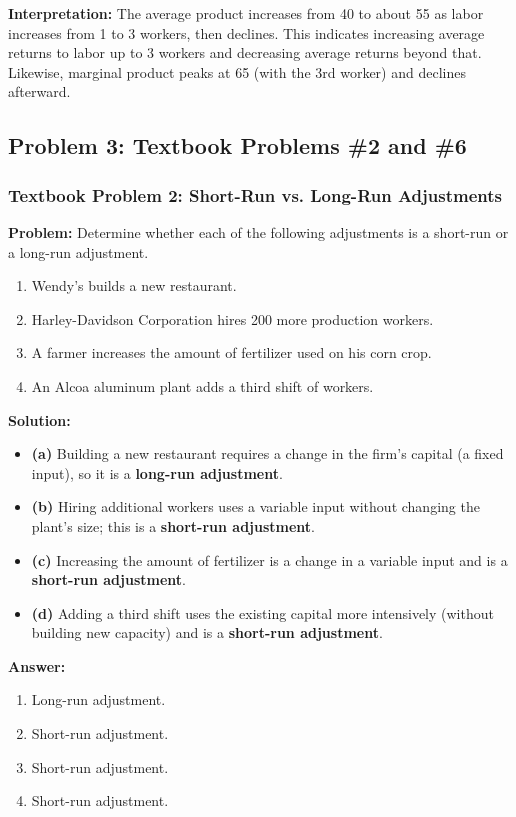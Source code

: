 \documentclass[12pt]{article}
\begin{document}
\textbf{Interpretation:} The average product increases from 40 to about 55 as labor increases from 1 to 3 workers, then declines. This indicates increasing average returns to labor up to 3 workers and decreasing average returns beyond that. Likewise, marginal product peaks at 65 (with the 3rd worker) and declines afterward.

\bigskip
\subsection*{Problem 3: Textbook Problems \#2 and \#6}

\subsubsection*{Textbook Problem 2: Short-Run vs. Long-Run Adjustments}
\textbf{Problem:} Determine whether each of the following adjustments is a short-run or a long-run adjustment.
\begin{enumerate}[label=(\alph*)]
  \item Wendy’s builds a new restaurant.
  \item Harley-Davidson Corporation hires 200 more production workers.
  \item A farmer increases the amount of fertilizer used on his corn crop.
  \item An Alcoa aluminum plant adds a third shift of workers.
\end{enumerate}

\textbf{Solution:}
\begin{itemize}[noitemsep]
  \item \textbf{(a)} Building a new restaurant requires a change in the firm's capital (a fixed input), so it is a \textbf{long-run adjustment}.
  \item \textbf{(b)} Hiring additional workers uses a variable input without changing the plant's size; this is a \textbf{short-run adjustment}.
  \item \textbf{(c)} Increasing the amount of fertilizer is a change in a variable input and is a \textbf{short-run adjustment}.
  \item \textbf{(d)} Adding a third shift uses the existing capital more intensively (without building new capacity) and is a \textbf{short-run adjustment}.
\end{itemize}

\textbf{Answer:}
\begin{enumerate}[label=(\alph*)]
  \item Long-run adjustment.
  \item Short-run adjustment.
  \item Short-run adjustment.
  \item Short-run adjustment.
\end{enumerate}
\end{document}
